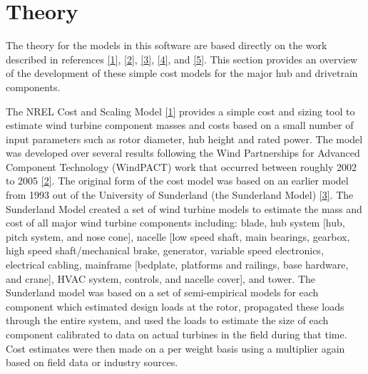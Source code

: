 \documentclass[letterpaper,10pt,openany,oneside]{sphinxmanual}
\begin{document}
\chapter{Theory}
\label{theory::doc}\label{theory:theory}\label{theory:id1}
The theory for the models in this software are based directly on the work described in references {\hyperref[theory:1]{{[}1{]}}}, {\hyperref[theory:2]{{[}2{]}}}, {\hyperref[theory:3]{{[}3{]}}}, {\hyperref[theory:4]{{[}4{]}}}, and {\hyperref[theory:5]{{[}5{]}}}.  This section provides an overview of the development of these simple cost models for the major hub and drivetrain components.

The NREL Cost and Scaling Model {\hyperref[theory:1]{{[}1{]}}} provides a simple cost and sizing tool to estimate wind turbine component masses and costs based on a small number of input parameters such as rotor diameter, hub height and rated power.  The model was developed over several results following the Wind Partnerships for Advanced Component Technology (WindPACT) work that occurred between roughly 2002 to 2005 {\hyperref[theory:2]{{[}2{]}}}.  The original form of the cost model was based on an earlier model from 1993 out of the University of Sunderland (the Sunderland Model) {\hyperref[theory:3]{{[}3{]}}}.  The Sunderland Model created a set of wind turbine models to estimate the mass and cost of all major wind turbine components including: blade, hub system {[}hub, pitch system, and nose cone{]}, nacelle {[}low speed shaft, main bearings, gearbox, high speed shaft/mechanical brake, generator, variable speed electronics, electrical cabling, mainframe {[}bedplate, platforms and railings, base hardware, and crane{]}, HVAC system, controls, and nacelle cover{]}, and tower.  The Sunderland model was based on a set of semi-empirical models for each component which estimated design loads at the rotor, propagated these loads through the entire system, and used the loads to estimate the size of each component calibrated to data on actual turbines in the field during that time.  Cost estimates were then made on a per weight basis using a multiplier again based on field data or industry sources.
\end{document}

